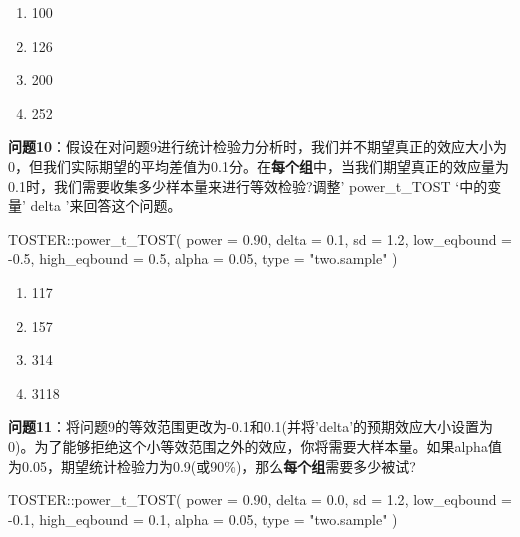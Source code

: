 \documentclass[
  letterpaper,
  DIV=11,
  numbers=noendperiod]{scrreprt}
\newenvironment{Shaded}{\begin{snugshade}}{\end{snugshade}}
\newcommand{\AttributeTok}[1]{\textcolor[rgb]{0.40,0.45,0.13}{#1}}
\newcommand{\FloatTok}[1]{\textcolor[rgb]{0.68,0.00,0.00}{#1}}
\newcommand{\FunctionTok}[1]{\textcolor[rgb]{0.28,0.35,0.67}{#1}}
\newcommand{\NormalTok}[1]{\textcolor[rgb]{0.00,0.23,0.31}{#1}}
\newcommand{\SpecialCharTok}[1]{\textcolor[rgb]{0.37,0.37,0.37}{#1}}
\newcommand{\StringTok}[1]{\textcolor[rgb]{0.13,0.47,0.30}{#1}}
\providecommand{\tightlist}{%
  \setlength{\itemsep}{0pt}\setlength{\parskip}{0pt}}\usepackage{longtable,booktabs,array}
\begin{document}
\begin{enumerate}
\def\labelenumi{\Alph{enumi})}
\tightlist
\item
  100
\item
  126
\item
  200
\item
  252
\end{enumerate}

\textbf{问题10}：假设在对问题9进行统计检验力分析时，我们并不期望真正的效应大小为0，但我们实际期望的平均差值为0.1分。在\textbf{每个组}中，当我们期望真正的效应量为0.1时，我们需要收集多少样本量来进行等效检验?调整'
power\_t\_TOST `中的变量' delta '来回答这个问题。

\begin{Shaded}
\begin{Highlighting}[]
\NormalTok{TOSTER}\SpecialCharTok{::}\FunctionTok{power\_t\_TOST}\NormalTok{(}
  \AttributeTok{power =} \FloatTok{0.90}\NormalTok{,}
  \AttributeTok{delta =} \FloatTok{0.1}\NormalTok{,}
  \AttributeTok{sd =} \FloatTok{1.2}\NormalTok{,}
  \AttributeTok{low\_eqbound =} \SpecialCharTok{{-}}\FloatTok{0.5}\NormalTok{,}
  \AttributeTok{high\_eqbound =} \FloatTok{0.5}\NormalTok{,}
  \AttributeTok{alpha =} \FloatTok{0.05}\NormalTok{,}
  \AttributeTok{type =} \StringTok{"two.sample"}
\NormalTok{)}
\end{Highlighting}
\end{Shaded}

\begin{enumerate}
\def\labelenumi{\Alph{enumi})}
\tightlist
\item
  117
\item
  157
\item
  314
\item
  3118
\end{enumerate}

\textbf{问题11}：将问题9的等效范围更改为-0.1和0.1(并将'delta'的预期效应大小设置为0)。为了能够拒绝这个小等效范围之外的效应，你将需要大样本量。如果alpha值为0.05，期望统计检验力为0.9(或90\%)，那么\textbf{每个组}需要多少被试?

\begin{Shaded}
\begin{Highlighting}[]
\NormalTok{TOSTER}\SpecialCharTok{::}\FunctionTok{power\_t\_TOST}\NormalTok{(}
  \AttributeTok{power =} \FloatTok{0.90}\NormalTok{,}
  \AttributeTok{delta =} \FloatTok{0.0}\NormalTok{,}
  \AttributeTok{sd =} \FloatTok{1.2}\NormalTok{,}
  \AttributeTok{low\_eqbound =} \SpecialCharTok{{-}}\FloatTok{0.1}\NormalTok{,}
  \AttributeTok{high\_eqbound =} \FloatTok{0.1}\NormalTok{,}
  \AttributeTok{alpha =} \FloatTok{0.05}\NormalTok{,}
  \AttributeTok{type =} \StringTok{"two.sample"}
\NormalTok{)}
\end{Highlighting}
\end{Shaded}
\end{document}
